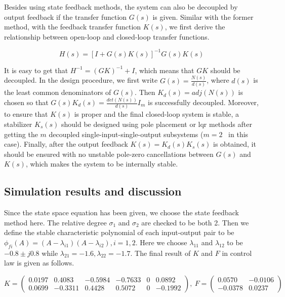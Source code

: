 \documentclass[hyperref]{article}
\theoremstyle{nonumberplain}
\begin{document}
	\hspace{1.0em}
	Besides using state feedback methods, the system can also be decoupled by output feedback if the transfer function $G(s)$ is given. Similar with the former method, with the feedback transfer function $K(s)$, we first derive the relationship between open-loop and closed-loop transfer functions.
	
	\begin{equation}
		H(s)=[I+G(s)K(s)]^{-1}G(s)K(s)
		\label{eq41}
	\end{equation}
	
	It is easy to get that $H^{-1}=(GK)^{-1}+I$, which means that $GK$ should be decoupled. In the design procedure, we first write $G(s)=\frac{N(s)}{d(s)}$, where $d(s)$ is the least common denominators of $G(s)$. Then $K_{d}(s)=adj(N(s))$ is chosen so that $G(s)K_{d}(s)=\frac{det(N(s))}{d(s)}I_{m}$ is successfully decoupled. Moreover, to ensure that $K(s)$ is proper and the final closed-loop system is stable, a stabilizer $K_{s}(s)$ should be designed using pole placement or lqr methods after getting the $m$ decoupled single-input-single-output subsystems ($m=2$ \ in this case). Finally, after the output feedback $K(s)=K_{d}(s)K_s(s)$ is obtained, it should be ensured with no unstable pole-zero cancellations between $G(s)$ and $K(s)$, which makes the system to be internally stable.
	
	
	\subsection{Simulation results and discussion}
	
	\hspace{1.0em}
	Since the state space equation has been given, we choose the state feedback method here. The relative degree $\sigma_{1}$ and $\sigma_{2}$ are checked to be both 2. Then we define the stable characteristic polynomial of each input-output pair to be $\phi _{fi}(A)=(A-\lambda_{i1})(A-\lambda_{i2}), i=1,2$. Here we choose $\lambda_{11}$ and $\lambda_{12}$ to be $-0.8\pm j0.8$ while $\lambda_{21}=-1.6,\lambda_{22}=-1.7$. The final result of $K$ and $F$ in control law is given as follows.
	
	\begin{equation}
	K=\begin{pmatrix}
	0.0197 &0.4083  &-0.5984  &-0.7633  &0  &0.0892 \\ 
	0.0699 &-0.3311  &0.4428  &0.5072  &0  &-0.1992 
	\end{pmatrix}, \ 
	F=\begin{pmatrix}
	0.0570 &-0.0106 \\ 
	-0.0378 &0.0237 
	\end{pmatrix}
	\nonumber
	\end{equation}
	
\end{document}
